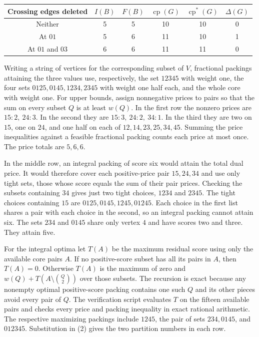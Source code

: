 \documentclass[english,11pt,a4paper]{article}
\newcounter{none}
\begin{document}
\begin{center}
\begin{tabular}{cccccc}
\toprule
Crossing edges deleted & $I(B)$ & $F(B)$ & $\operatorname{cp}(G)$ & $\operatorname{cp}^{\ast}(G)$ & $\Delta(G)$ \\
\midrule
Neither & 5 & 5 & 10 & 10 & 0 \\
At $01$ & 5 & 6 & 11 & 10 & 1 \\
At $01$ and $03$ & 6 & 6 & 11 & 11 & 0 \\
\bottomrule
\end{tabular}
\end{center}

Writing a string of vertices for the corresponding subset of \(V\), fractional packings attaining the three values use, respectively, the set \(12345\) with weight one, the four sets \(0125,0145,1234,2345\) with weight one half each, and the whole core with weight one. For upper bounds, assign nonnegative prices to pairs so that the sum on every subset \(Q\) is at least \(w(Q)\). In the first row the nonzero prices are \(15:2,\ 24:3\). In the second they are \(15:3,\ 24:2,\ 34:1\). In the third they are two on \(15\), one on \(24\), and one half on each of \(12,14,23,25,34,45\). Summing the price inequalities against a feasible fractional packing counts each price at most once. The price totals are \(5,6,6\).

In the middle row, an integral packing of score six would attain the total dual price. It would therefore cover each positive-price pair \(15,24,34\) and use only tight sets, those whose score equals the sum of their pair prices. Checking the subsets containing \(34\) gives just two tight choices, \(1234\) and \(2345\). The tight choices containing \(15\) are \(0125,0145,1245,01245\). Each choice in the first list shares a pair with each choice in the second, so an integral packing cannot attain six. The sets \(234\) and \(0145\) share only vertex \(4\) and have scores two and three. They attain five.

For the integral optima let \(T(A)\) be the maximum residual score using only the available core pairs \(A\). If no positive-score subset has all its pairs in \(A\), then \(T(A)=0\). Otherwise \(T(A)\) is the maximum of zero and \(w(Q)+T(A\setminus\binom Q2)\) over those subsets. The recursion is exact because any nonempty optimal positive-score packing contains one such \(Q\) and its other pieces avoid every pair of \(Q\). The verification script evaluates \(T\) on the fifteen available pairs and checks every price and packing inequality in exact rational arithmetic. The respective maximizing packings include \(1245\), the pair of sets \(234,0145\), and \(012345\). Substitution in (2) gives the two partition numbers in each row.
\end{document}
